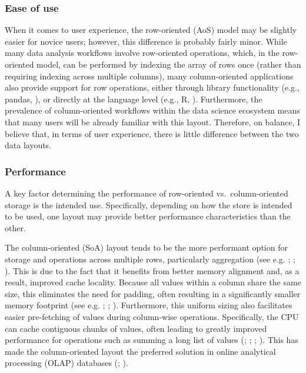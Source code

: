 \documentclass[
  openany]{book}
\theoremstyle{definition}
\theoremstyle{definition}
\theoremstyle{definition}
\theoremstyle{definition}
\theoremstyle{remark}
\begin{document}
\subsubsection{Ease of use}\label{ease-of-use}

When it comes to user experience, the row-oriented (AoS) model may be slightly easier for novice users; however, this difference is probably fairly minor. While many data analysis workflows involve row-oriented operations, which, in the row-oriented model, can be performed by indexing the array of rows once (rather than requiring indexing across multiple columns), many column-oriented applications also provide support for row operations, either through library functionality (e.g., pandas, ), or directly at the language level (e.g., R, ). Furthermore, the prevalence of column-oriented workflows within the data science ecosystem means that many users will be already familiar with this layout. Therefore, on balance, I believe that, in terms of user experience, there is little difference between the two data layouts.

\subsubsection{Performance}\label{row-column-performance}

A key factor determining the performance of row-oriented vs.~column-oriented storage is the intended use. Specifically, depending on how the store is intended to be used, one layout may provide better performance characteristics than the other.

The column-oriented (SoA) layout tends to be the more performant option for storage and operations across multiple rows, particularly aggregation (see e.g. ; ; ). This is due to the fact that it benefits from better memory alignment and, as a result, improved cache locality. Because all values within a column share the same size, this eliminates the need for padding, often resulting in a significantly smaller memory footprint (see e.g. ; ; ). Furthermore, this uniform sizing also facilitates easier pre-fetching of values during column-wise operations. Specifically, the CPU can cache contiguous chunks of values, often leading to greatly improved performance for operations such as summing a long list of values (; ; ; ). This has made the column-oriented layout the preferred solution in online analytical processing (OLAP) databases (; ).
\end{document}
